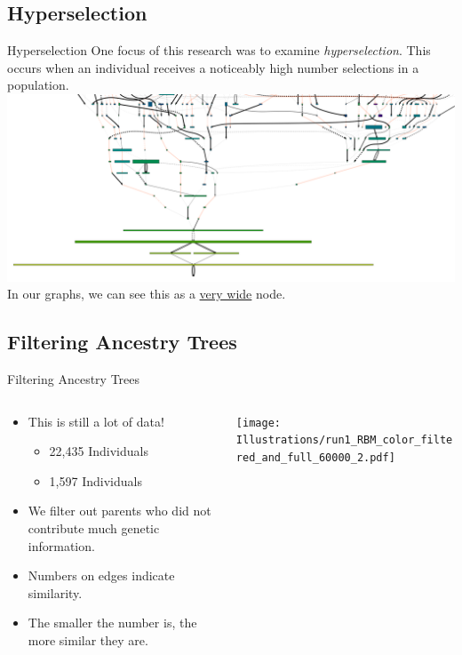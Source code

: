 \documentclass{beamer}
\begin{document}
\subsection{Hyperselection}
\begin{frame}{Hyperselection}
One focus of this research was to examine \textit{hyperselection}.
This occurs when an individual receives a noticeably high number selections in a population. 
\center \includegraphics[width=\textwidth]{Illustrations/cropped.pdf} \\
In our graphs, we can see this as a \underline{very wide} node. 
\end{frame}

\subsection{Filtering Ancestry Trees}

\begin{frame}{Filtering Ancestry Trees}
\begin{columns}
\begin{column}{.6\textwidth}
\begin{itemize}
\item This is still a lot of data!
\begin{itemize}
\item 22,435 Individuals
\item 1,597 Individuals
\end{itemize}
\item We filter out parents who did not contribute much genetic information.
\item Numbers on edges indicate similarity.
\item The smaller the number is, the more similar they are.
\end{itemize}
\end{column}
\begin{column}{.45\textwidth}
\center
\texttt{[image: Illustrations/run1\_RBM\_color\_filtered\_and\_full\_60000\_2.pdf]} 
\end{column}
\end{columns}
\end{frame}
\end{document}
